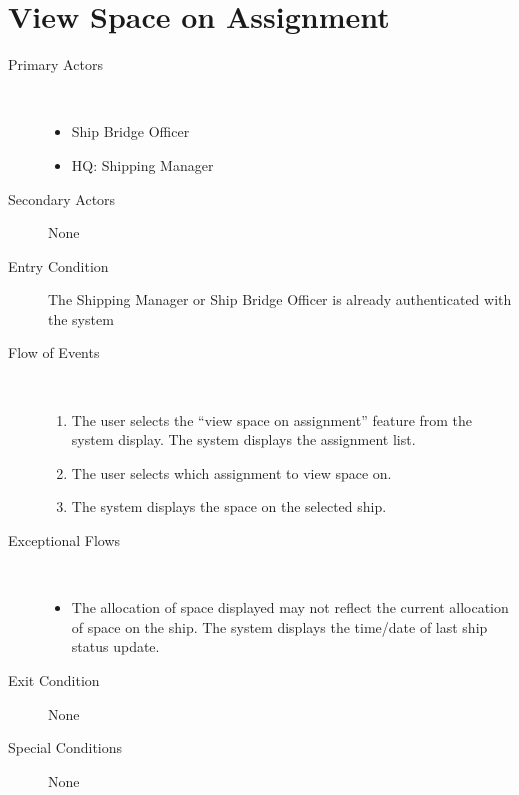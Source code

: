 \documentclass[a4paper,10pt]{report}
\begin{document}
\section{View Space on Assignment}
\begin{description}
\item[Primary Actors] \
  \begin{itemize}
    \item Ship Bridge Officer
    \item HQ: Shipping Manager
  \end{itemize}
\item[Secondary Actors] None
\item[Entry Condition]
  The Shipping Manager or Ship Bridge Officer is already authenticated with the system
\item[Flow of Events] \
  \begin{enumerate}
    \item The user selects the ``view space on assignment'' feature from the system display. The system displays the assignment list.
    \item The user selects which assignment to view space on.
    \item The system displays the space on the selected ship.
  \end{enumerate}
\item[Exceptional Flows] \
  \begin{itemize}
    \item The allocation of space displayed may not reflect the current allocation of space on the ship. The system displays the time/date of last ship status update.
  \end{itemize}
\item[Exit Condition] None
\item[Special Conditions] None
\end{description}
\end{document}

